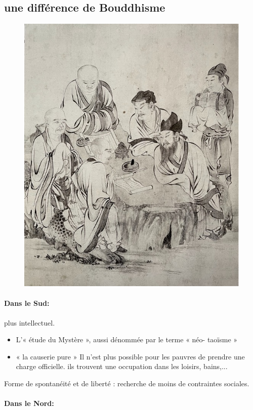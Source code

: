 \subsection{une différence de Bouddhisme}
\begin{figure}[!h]
    \centering
    \includegraphics[width=.5\textwidth]{ConfucianismeTaoismeBouddhismeChinois/causeriesud.jpg}

    \label{fig:enter-label}
\end{figure}

\paragraph{Dans le Sud:} plus intellectuel.

\begin{itemize}
    \item L’« étude du Mystère », aussi dénommée par le terme « néo- taoïsme »
    \item « la causerie pure »
 Il n'est plus possible pour les pauvres de prendre une charge officielle. ils trouvent une occupation dans les loisirs, bains,...
\end{itemize}



 Forme de spontanéité et de liberté : recherche de moins de contraintes sociales. 

\textit{}


 \paragraph{Dans le Nord:}




